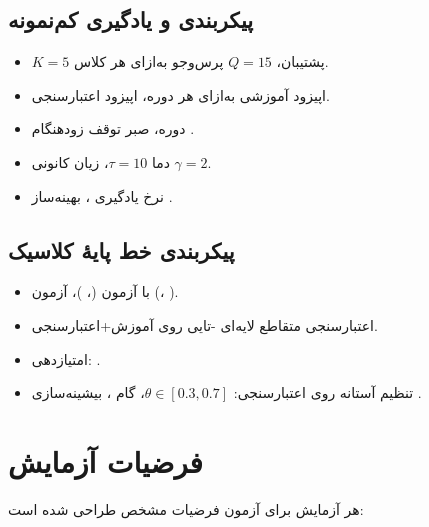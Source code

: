 \subsection{\texorpdfstring{پیکربندی  و یادگیری کم‌نمونه}{پیکربندی ETHOS و یادگیری کم‌نمونه}}

\begin{itemize}
\item $K = 5$ پشتیبان، $Q = 15$ پرس‌وجو به‌ازای هر کلاس.
\item {} اپیزود آموزشی به‌ازای هر دوره،  اپیزود اعتبارسنجی.
\item {} دوره، صبر توقف زودهنگام .
\item دما $\tau = 10$، زیان کانونی $\gamma = 2$.
\item نرخ یادگیری ، بهینه‌ساز .
\end{itemize}

\subsection{پیکربندی خط پایۀ کلاسیک}

\begin{itemize}
\item {} با  آزمون (، )،  آزمون (، ).
\item اعتبارسنجی متقاطع لایه‌ای -تایی روی آموزش+اعتبارسنجی.
\item امتیازدهی: .
\item تنظیم آستانه روی اعتبارسنجی: $\theta \in [0.3, 0.7]$، گام ، بیشینه‌سازی .
\end{itemize}

\section{فرضیات آزمایش}

هر آزمایش برای آزمون فرضیات مشخص طراحی شده است:

